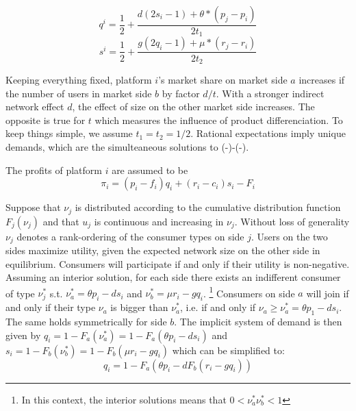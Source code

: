 \documentclass[10pt,a4paper]{article}
\begin{document}
$$q^i=\frac{1}{2}+\frac{d(2s_i-1)+\theta*(p_j-p_i)}{2t_1}$$ $$s^i=\frac{1}{2}+\frac{g(2q_i-1)+\mu*(r_j-r_i)}{2t_2}$$

Keeping everything fixed, platform $i$'s market share on market side $a$ increases if the number of users in market side $b$ by factor $d/t$. With a stronger indirect network effect $d$, the effect of size on the other market side increases. The opposite is true for $t$ which measures the influence of product differenciation. To keep things simple, we assume $t_1=t_2=1/2$. Rational expectations imply unique demands, which are the simulteaneous solutions to (-)-(-). 

The profits of platform $i$ are assumed to be
$$\pi_i=(p_i-f_i)q_i+(r_i-c_i)s_i-F_i$$ 


Suppose that $\nu_j$ is distributed according to the cumulative distribution function $F_j(\nu_j)$ and that $u_j$ is continuous and increasing in $\nu_j$. Without loss of generality $\nu_j$ denotes a rank-ordering of the consumer types on side $j$. Users on the two sides maximize utility, given the expected network size on the other side in equilibrium. Consumers will participate if and only if their utility is non-negative. 
Assuming an interior solution, for each side there exists an indifferent consumer of type $\nu^*_j$ s.t. $\nu^*_a=\theta p_i-ds_i$ and  $\nu^*_b=\mu r_i-gq_i$. \footnote{In this context, the interior solutions means that $0<\nu^*_a\nu^*_b<1$} Consumers on side $a$ will join if and only if their type $\nu_a$ is bigger than $\nu^*_a$, i.e. if and only if $\nu_a \geq \nu^*_a = \theta p_1-ds_i$. The same holds symmetrically for side $b$. The implicit system of demand is then given by $q_i=1-F_a(\nu^*_a)=1-F_a(\theta p_i-ds_i)$ and $s_i=1-F_b(\nu^*_b)=1-F_b(\mu r_i-gq_i)$ which can be simplified to: $$ q_i=1-F_a(\theta p_i-dF_b(r_i-gq_i))$$
\end{document}
